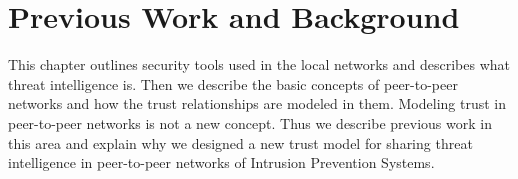 \chapter{Previous Work and Background}
\label{ch:previous-work-background}
This chapter outlines security tools used in the local networks and describes what threat intelligence is.
Then we describe the basic concepts of peer-to-peer networks and how the trust relationships are modeled in them.
Modeling trust in peer-to-peer networks is not a new concept. Thus we describe previous work in this area and explain why we designed a new trust model for sharing threat intelligence in peer-to-peer networks of Intrusion Prevention Systems.



